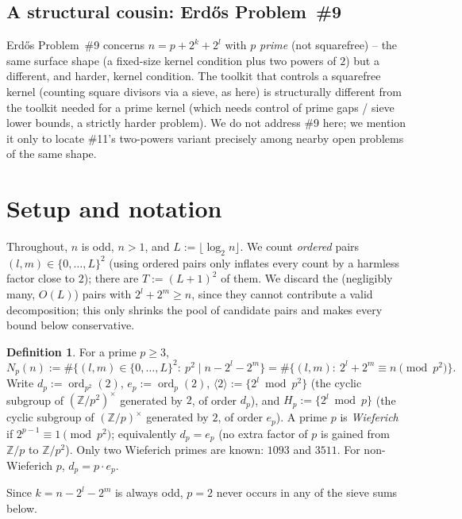 \documentclass[11pt]{article}
\theoremstyle{plain}
\theoremstyle{definition}
\newtheorem{definition}[theorem]{Definition}
\theoremstyle{remark}
\newcommand{\Z}{\mathbb{Z}}
\newcommand{\ord}{\operatorname{ord}}
\newcommand{\dpp}{d_p}
\newcommand{\ep}{e_p}
\begin{document}
\subsection{A structural cousin: Erd\H{o}s Problem~\#9}

Erd\H{o}s Problem~\#9 concerns $n=p+2^k+2^l$ with $p$ \emph{prime} (not
squarefree) -- the same surface shape (a fixed-size kernel condition plus two
powers of $2$) but a different, and harder, kernel condition. The toolkit
that controls a squarefree kernel (counting square divisors via a sieve, as
here) is structurally different from the toolkit needed for a prime kernel
(which needs control of prime gaps / sieve lower bounds, a strictly harder
problem). We do not address \#9 here; we mention it only to locate
\#11's two-powers variant precisely among nearby open problems of the same
shape.

\section{Setup and notation}\label{sec:setup}

Throughout, $n$ is odd, $n>1$, and $L:=\lfloor\log_2n\rfloor$. We count
\emph{ordered} pairs $(l,m)\in\{0,\dots,L\}^2$ (using ordered pairs only
inflates every count by a harmless factor close to $2$); there are
$T:=(L+1)^2$ of them. We discard the (negligibly many, $O(L)$) pairs with
$2^l+2^m\ge n$, since they cannot contribute a valid decomposition; this only
shrinks the pool of candidate pairs and makes every bound below
conservative.

\begin{definition}
For a prime $p\ge3$,
\[
N_p(n):=\#\{(l,m)\in\{0,\dots,L\}^2:\ p^2\mid n-2^l-2^m\}
=\#\{(l,m):\ 2^l+2^m\equiv n\pmod{p^2}\}.
\]
Write $\dpp:=\ord_{p^2}(2)$, $\ep:=\ord_p(2)$,
$\langle2\rangle:=\{2^l\bmod p^2\}$ (the cyclic subgroup of
$(\Z/p^2)^\times$ generated by $2$, of order $\dpp$), and
$H_p:=\{2^l\bmod p\}$ (the cyclic subgroup of $(\Z/p)^\times$ generated by
$2$, of order $\ep$). A prime $p$ is \emph{Wieferich} if $2^{p-1}\equiv1
\pmod{p^2}$; equivalently $\dpp=\ep$ (no extra factor of $p$ is gained from
$\Z/p$ to $\Z/p^2$). Only two Wieferich primes are known: $1093$ and $3511$.
For non-Wieferich $p$, $\dpp=p\cdot\ep$.
\end{definition}

Since $k=n-2^l-2^m$ is always odd, $p=2$ never occurs in any of the sieve
sums below.
\end{document}
